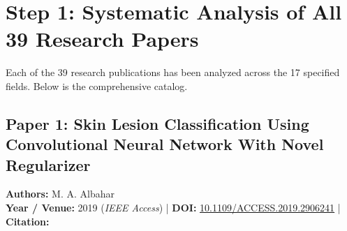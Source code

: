 \documentclass[11pt,a4paper]{article}
\begin{document}
\section{Step 1: Systematic Analysis of All 39 Research Papers}
Each of the 39 research publications has been analyzed across the 17 specified fields. Below is the comprehensive catalog.

\subsection{Paper 1: Skin Lesion Classification Using Convolutional Neural Network With Novel Regularizer}
\textbf{Authors:} M. A. Albahar \\
\textbf{Year / Venue:} 2019 (\textit{IEEE Access}) | \textbf{DOI:} \href{https://doi.org/10.1109/ACCESS.2019.2906241}{10.1109/ACCESS.2019.2906241} | \textbf{Citation:} \cite{8669763}
\end{document}
